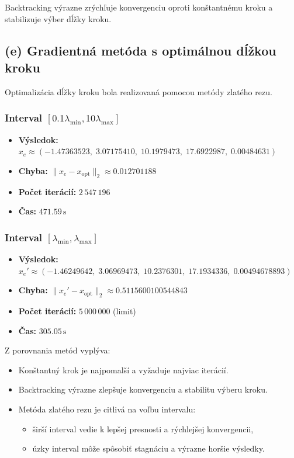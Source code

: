 \documentclass[titlepage]{article}
\begin{document}
Backtracking výrazne zrýchľuje konvergenciu oproti konštantnému kroku a stabilizuje výber dĺžky kroku.

\subsection*{(e) Gradientná metóda s optimálnou dĺžkou kroku}

Optimalizácia dĺžky kroku bola realizovaná pomocou metódy zlatého rezu.

\subsubsection*{Interval \([0.1\lambda_{\min}, 10\lambda_{\max}]\)}

\begin{itemize}
    \item \textbf{Výsledok:} $x_e \approx (-1.47363523,\; 3.07175410,\; 10.1979473,\; 17.6922987,\; 0.00484631)$
    \item \textbf{Chyba:} $\|x_e - x_{\text{opt}}\|_2 \approx 0.012701188$
    \item \textbf{Počet iterácií:} $2\,547\,196$
    \item \textbf{Čas:} $471.59\,\mathrm{s}$
\end{itemize}

\subsubsection*{Interval \([\lambda_{\min}, \lambda_{\max}]\)}

\begin{itemize}
    \item \textbf{Výsledok:} $x_e' \approx (-1.46249642,\; 3.06969473,\; 10.2376301,\; 17.1934336,\; 0.00494678893)$
    \item \textbf{Chyba:} $\|x_e' - x_{\text{opt}}\|_2 \approx 0.5115600100544843$
    \item \textbf{Počet iterácií:} $5\,000\,000$ (limit)
    \item \textbf{Čas:} $305.05\,\mathrm{s}$
\end{itemize}



Z porovnania metód vyplýva:

\begin{itemize}
    \item Konštantný krok je najpomalší a vyžaduje najviac iterácií.
    \item Backtracking výrazne zlepšuje konvergenciu a stabilitu výberu kroku.
    \item Metóda zlatého rezu je citlivá na voľbu intervalu:
    \begin{itemize}
        \item širší interval vedie k lepšej presnosti a rýchlejšej konvergencii,
        \item úzky interval môže spôsobiť stagnáciu a výrazne horšie výsledky.
    \end{itemize}
\end{itemize}
\end{document}
